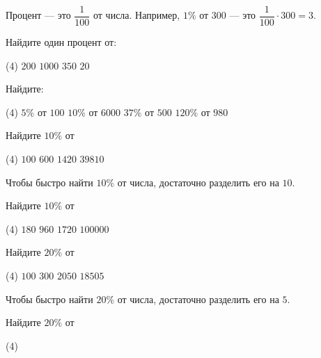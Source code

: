 %
%

\begin{class}[number=1]
		\begin{definit}
			Процент --- это \( \dfrac{1}{100} \) от числа. Например, \( 1\% \) от \( 300 \) --- это \( \dfrac{1}{100}\cdot300=3 \).
		\end{definit}
		\begin{listofex}
		\item Найдите один процент от:
		\begin{tasks}(4)
			\task \( 200 \)
			\task \( 1000 \)
			\task \( 350 \)
			\task \( 20 \)
		\end{tasks}
		\item Найдите:
		\begin{tasks}(4)
			\task \( 5\% \) от \( 100 \)
			\task \( 10\% \) от \( 6000 \)
			\task \( 37\% \) от \( 500 \)
			\task \( 120\% \) от \( 980 \)
		\end{tasks}
		\item Найдите \( 10\% \) от
		\begin{tasks}(4)
			\task \( 100 \)
			\task \( 600 \)
			\task \( 1420 \)
			\task \( 39810 \)
		\end{tasks} 
	\end{listofex}
		\begin{definit}
			Чтобы быстро найти \( 10\% \) от числа, достаточно разделить его на \( 10 \).
		\end{definit}
	\begin{listofex}[resume]
		\item Найдите \( 10\% \) от
		\begin{tasks}(4)
			\task \( 180 \)
			\task \( 960 \)
			\task \( 1720 \)
			\task \( 100000 \)
		\end{tasks}
		\item Найдите \( 20\% \) от 
		\begin{tasks}(4)
			\task \( 100 \)
			\task \( 300 \)
			\task \( 2050 \)
			\task \( 18505 \)
		\end{tasks}
		\end{listofex}
		\begin{definit}
		Чтобы быстро найти \( 20\% \) от числа, достаточно разделить его на \( 5 \).
		\end{definit}	
		\begin{listofex}[resume]
		\item Найдите \( 20\% \) от
		\begin{tasks}(4)

\end{tasks}
\end{listofex}
\end{class}

